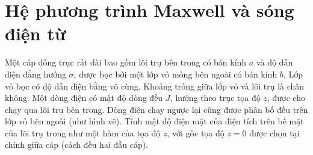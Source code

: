 \chapter{Hệ phương trình Maxwell và sóng điện từ}
\begin{vd}
 Một cáp đồng trục rất dài bao gồm lõi trụ bên trong có bán kính $a$ và độ dẫn điện đẳng hướng $\sigma$, được bọc bởi một lớp vỏ mỏng bên ngoài có bán kính $b$. Lớp vỏ bọc có độ dẫn điện bằng vô cùng. Khoảng trống giữa lớp vỏ và lõi trụ là chân không. Một dòng điện có mật độ dòng đều $J$, hướng theo trục tọa độ $z$, được cho chạy qua lõi trụ bên trong. Dòng điện chạy ngược lại cũng được phân bố đều trên lớp vỏ bên ngoài (như hình vẽ). Tính mật độ điện mặt của điện tích trên bề mặt của lõi trụ trong như một hàm của tọa độ $z$, với gốc tọa độ $z=0$ được chọn tại chính giữa cáp (cách đều hai đầu cáp).
         \begin{center}



\begin{tikzpicture}[x=0.75pt,y=0.75pt,yscale=-1,xscale=1]


\end{tikzpicture}
\end{center}
\end{vd}

